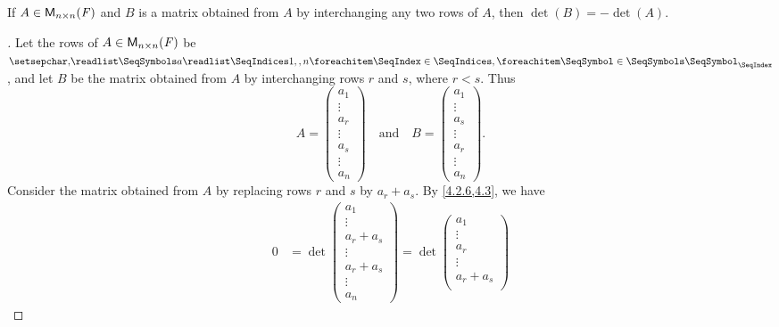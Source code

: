 \begin{thm}\label{4.5}
	If \(A \in \ms[n][n][\F]\) and \(B\) is a matrix obtained from \(A\) by interchanging any two rows of \(A\), then \(\det(B) = -\det(A)\).
\end{thm}

\begin{proof}[]
	Let the rows of \(A \in \ms[n][n][\F]\) be \(\seq{a}{1,,n}\), and let \(B\) be the matrix obtained from \(A\) by interchanging rows \(r\) and \(s\), where \(r < s\).
	Thus
	\[
		A = \begin{pmatrix}
			a_1    \\
			\vdots \\
			a_r    \\
			\vdots \\
			a_s    \\
			\vdots \\
			a_n
		\end{pmatrix} \quad \text{and} \quad B = \begin{pmatrix}
			a_1    \\
			\vdots \\
			a_s    \\
			\vdots \\
			a_r    \\
			\vdots \\
			a_n
		\end{pmatrix}.
	\]
	Consider the matrix obtained from \(A\) by replacing rows \(r\) and \(s\) by \(a_r + a_s\).
	By \cref{4.2.6,4.3}, we have
	\begin{align*}
		0 & = \det\begin{pmatrix}
			          a_1       \\
			          \vdots    \\
			          a_r + a_s \\
			          \vdots    \\
			          a_r + a_s \\
			          \vdots    \\
			          a_n
		          \end{pmatrix} = \det\begin{pmatrix}
			                              a_1       \\
			                              \vdots    \\
			                              a_r       \\
			                              \vdots    \\
			                              a_r + a_s \\

\end{pmatrix}
\end{align*}
\end{proof}
